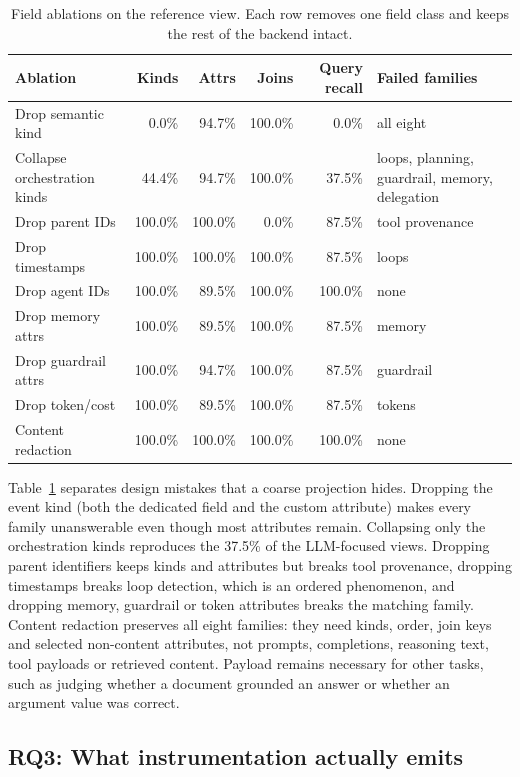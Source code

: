 \documentclass[conference]{IEEEtran}
\begin{document}
\begin{table}[t]
\centering
\scriptsize
\caption{Field ablations on the reference view. Each row removes one
field class and keeps the rest of the backend intact.}
\label{tab:ablation}
\begin{tabular}{@{}lrrrrp{}@{}}
\toprule
Ablation & Kinds & Attrs & Joins & Query recall & Failed families \\
\midrule
Drop semantic kind & 0.0\% & 94.7\% & 100.0\% & 0.0\% & all eight \\
Collapse orchestration kinds & 44.4\% & 94.7\% & 100.0\% & 37.5\% & loops, planning, guardrail, memory, delegation \\
Drop parent IDs & 100.0\% & 100.0\% & 0.0\% & 87.5\% & tool provenance \\
Drop timestamps & 100.0\% & 100.0\% & 100.0\% & 87.5\% & loops \\
Drop agent IDs & 100.0\% & 89.5\% & 100.0\% & 100.0\% & none \\
Drop memory attrs & 100.0\% & 89.5\% & 100.0\% & 87.5\% & memory \\
Drop guardrail attrs & 100.0\% & 94.7\% & 100.0\% & 87.5\% & guardrail \\
Drop token/cost & 100.0\% & 89.5\% & 100.0\% & 87.5\% & tokens \\
Content redaction & 100.0\% & 100.0\% & 100.0\% & 100.0\% & none \\
\bottomrule
\end{tabular}
\end{table}

Table~\ref{tab:ablation} separates design mistakes that a coarse
projection hides. Dropping the event kind (both the dedicated field and
the custom attribute) makes every family unanswerable even though most
attributes remain. Collapsing only the orchestration kinds reproduces
the 37.5\% of the LLM-focused views. Dropping parent identifiers keeps
kinds and attributes but breaks tool provenance, dropping timestamps
breaks loop detection, which is an ordered phenomenon, and dropping
memory, guardrail or token attributes breaks the matching family.
Content redaction preserves all eight families: they need kinds, order,
join keys and selected non-content attributes, not prompts,
completions, reasoning text, tool payloads or retrieved content.
Payload remains necessary for other tasks, such as judging whether a
document grounded an answer or whether an argument value was correct.

\subsection{RQ3: What instrumentation actually emits}
\end{document}
